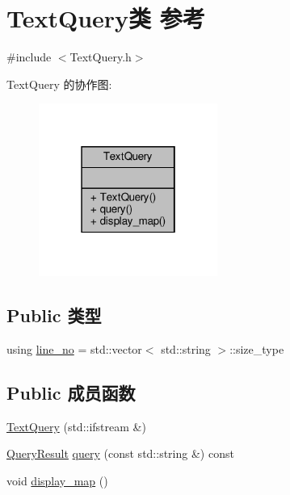 \hypertarget{classTextQuery}{}\section{Text\+Query类 参考}
\label{classTextQuery}


{\ttfamily \#include $<$Text\+Query.\+h$>$}



Text\+Query 的协作图\+:\nopagebreak
\begin{figure}[H]
\begin{center}
\leavevmode
\includegraphics[width=166pt]{classTextQuery__coll__graph}
\end{center}
\end{figure}
\subsection*{Public 类型}
\begin{DoxyCompactItemize}
\item 
using \hyperlink{classTextQuery_a504c1be8d67d4fcf4c205999e2377262}{line\+\_\+no} = std\+::vector$<$ std\+::string $>$\+::size\+\_\+type
\end{DoxyCompactItemize}
\subsection*{Public 成员函数}
\begin{DoxyCompactItemize}
\item 
\hyperlink{classTextQuery_a7362fe39ff27f72b5aa4127459318606}{Text\+Query} (std\+::ifstream \&)
\item 
\hyperlink{classQueryResult}{Query\+Result} \hyperlink{classTextQuery_acdbf168c6de152095bce2ce3aaa11d1d}{query} (const std\+::string \&) const
\item 
void \hyperlink{classTextQuery_a481824aee58568ba51455e3131f479dd}{display\+\_\+map} ()
\end{DoxyCompactItemize}


